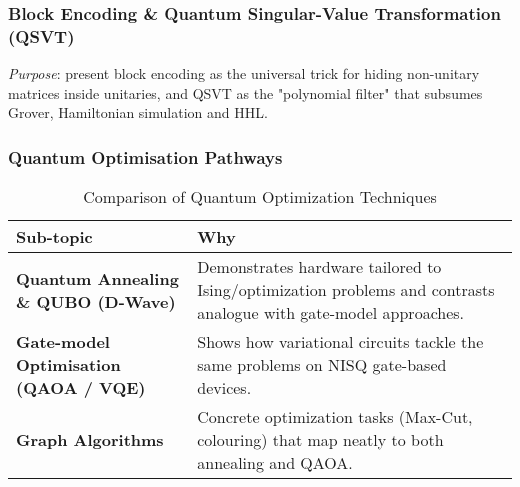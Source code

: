 \subsubsection{Block Encoding \& Quantum Singular-Value Transformation (QSVT)}

\emph{Purpose}: present block encoding as the universal trick for hiding non-unitary matrices inside unitaries, 
and QSVT as the "polynomial filter" that subsumes Grover, Hamiltonian simulation and HHL.




\subsubsection{Quantum Optimisation Pathways}

\begin{table}[ht]
	\centering
	\begin{tabular}{|p{5cm}p{9.5cm}|}
		\hline
		\textbf{Sub-topic} & \textbf{Why} \\
		\hline
		\textbf{Quantum Annealing \& QUBO (D-Wave)} & Demonstrates hardware tailored to Ising/optimization problems and contrasts analogue with gate-model approaches. \\
		\hline
		\textbf{Gate-model Optimisation (QAOA / VQE)} & Shows how variational circuits tackle the same problems on NISQ gate-based devices. \\
		\hline
		\textbf{Graph Algorithms} & Concrete optimization tasks (Max-Cut, colouring) that map neatly to both annealing and QAOA. \\
		\hline
	\end{tabular}
	\caption{Comparison of Quantum Optimization Techniques}
\end{table}

